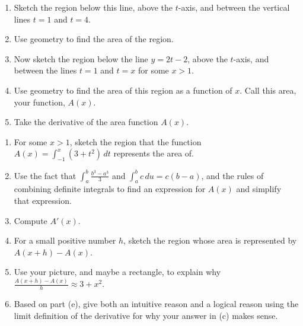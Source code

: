 \begin{enumerate}

\item  Sketch the region below this line, above the $t$-axis, and between the vertical lines $t=1$ and $t = 4$.

\smallskip

\item  Use geometry to find the area of the region.

\smallskip

\item  Now sketch the region below the line $y=2t -2$, above the $t$-axis, and between the lines $t=1$ and $t=x$ for some $x > 1$.

\smallskip

\item  Use geometry to find the area of this region as a function of $x$.  Call this area, your function, $A(x)$.

\smallskip

\item  Take the derivative of the area function $A(x)$.

\smallskip

\end{enumerate}

\begin{enumerate}

\item  For some $x>1$, sketch the region that the function $\displaystyle{A(x) = \int_{-1}^x (3 + t^2)\,dt}$ represents the area of.

\item  Use the fact that $\displaystyle{\int_a^b \frac{b^3-a^3}{3}}$ and $\displaystyle{\int_a^bc\,du = c(b-a)}$, and the rules of combining definite integrals to find an expression for $A(x)$ and simplify that expression.

\smallskip

\item  Compute $A'(x)$.

\smallskip

\item  For a small positive number $h$, sketch the region whose area is represented by \\$A(x + h) - A(x)$.

\smallskip

\item  Use your picture, and maybe a rectangle, to explain why $\displaystyle{\frac{A(x+h) - A(x)}{h} \approx 3 + x^2}$.

\smallskip

\item  Based on part (e), give both an intuitive reason and a logical reason using the limit definition of the derivative for why your answer in (c) makes sense.

\smallskip

\end{enumerate}